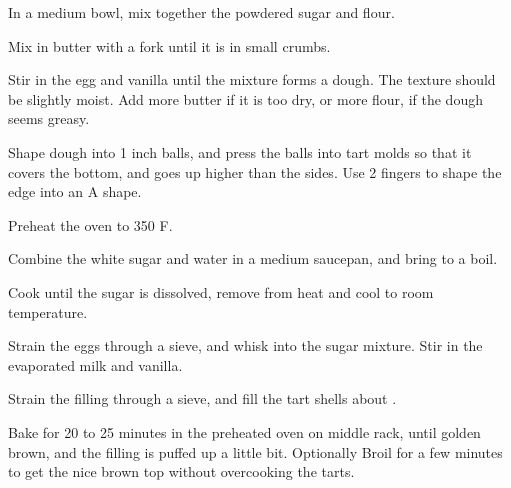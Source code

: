 In a medium bowl, mix together the powdered sugar and flour. 

Mix in butter with a fork until it is in small crumbs. 

Stir in the egg and vanilla until the mixture forms a dough. 
The texture should be slightly moist. Add more butter if it is too dry, or more flour, if the dough seems greasy. 

Shape dough into 1 inch balls, and press the balls into tart molds so that it covers the bottom, and goes up higher than the sides. 
Use 2 fingers to shape the edge into an A shape.

Preheat the oven to 350 \degree F.

Combine the white sugar and water in a medium saucepan, and bring to a boil. 

Cook until the sugar is dissolved, remove from heat and cool to room temperature. 

Strain the eggs through a sieve, and whisk into the sugar mixture. 
Stir in the evaporated milk and vanilla. 
 
Strain the filling through a sieve, and fill the tart shells about .

Bake for 20 to 25 minutes in the preheated oven on middle rack, until golden brown, and the filling is puffed up a little bit.
Optionally Broil for a few minutes to get the nice brown top without overcooking the tarts.